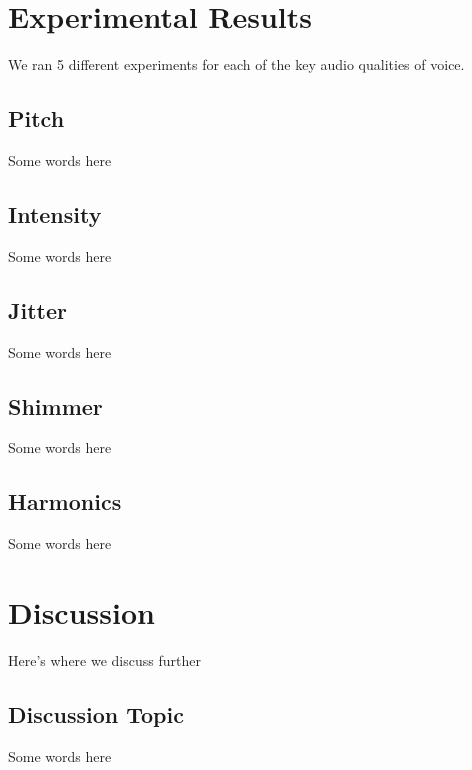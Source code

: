 \documentclass[10pt,twocolumn,letterpaper]{article}
\begin{document}
\section{Experimental Results}
\label{sec:results}

We ran 5 different experiments for each of the key audio qualities of voice.

\subsection{Pitch}

Some words here

\subsection{Intensity}

Some words here

\subsection{Jitter}

Some words here

\subsection{Shimmer}

Some words here

\subsection{Harmonics}

Some words here

\section{Discussion}
\label{sec:discussion}

Here's where we discuss further

\subsection{Discussion Topic}

Some words here

\end{document}
